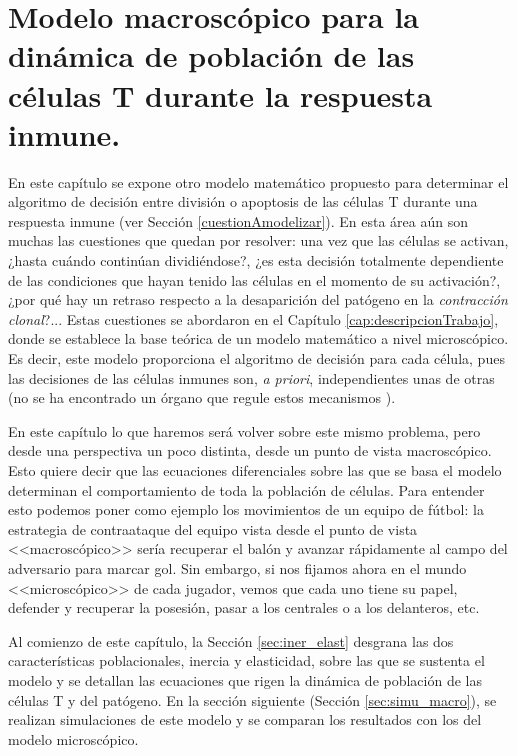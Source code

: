 
\chapter{Modelo macroscópico para la dinámica de población de las células T durante la respuesta inmune.}
\label{cap:modeloMacroscopico}

En este capítulo se expone otro modelo matemático propuesto para determinar el algoritmo de decisión entre división o apoptosis de las células T durante una respuesta inmune (ver Sección \ref{cuestionAmodelizar}). En esta área aún son muchas las cuestiones que quedan por resolver: una vez que las células se activan, ¿hasta cuándo continúan dividiéndose?, ¿es esta decisión totalmente dependiente de las condiciones que hayan tenido las células en el momento de su activación?, ¿por qué hay un retraso respecto a la desaparición del patógeno en la \textit{contracción clonal}?... Estas cuestiones se abordaron en el Capítulo \ref{cap:descripcionTrabajo}, donde se establece la base teórica de un modelo matemático a nivel microscópico. Es decir, este modelo proporciona el algoritmo de decisión para cada célula, pues las decisiones de las células inmunes son, \textit{a priori}, independientes unas de otras (no se ha encontrado un órgano que regule estos mecanismos \citep{arias2016emergent}).

En este capítulo lo que haremos será volver sobre este mismo problema, pero desde una perspectiva un poco distinta, desde un punto de vista macroscópico. Esto quiere decir que las ecuaciones diferenciales sobre las que se basa el modelo determinan el comportamiento de toda la población de células. Para entender esto podemos poner como ejemplo los movimientos de un equipo de fútbol: la estrategia de contraataque del equipo vista desde el punto de vista <<macroscópico>> sería recuperar el balón y avanzar rápidamente al campo del adversario para marcar gol. Sin embargo, si nos fijamos ahora en el mundo <<microscópico>> de cada jugador, vemos que cada uno tiene su papel, defender y recuperar la posesión, pasar a los centrales o a los delanteros, etc.

Al comienzo de este capítulo, la Sección \ref{sec:iner_elast} desgrana las dos características poblacionales, inercia y elasticidad, sobre las que se sustenta el modelo y se detallan las ecuaciones que rigen la dinámica de población de las células T y del patógeno. En la sección siguiente (Sección \ref{sec:simu_macro}), se realizan simulaciones de este modelo y se comparan los resultados con los del modelo microscópico.



